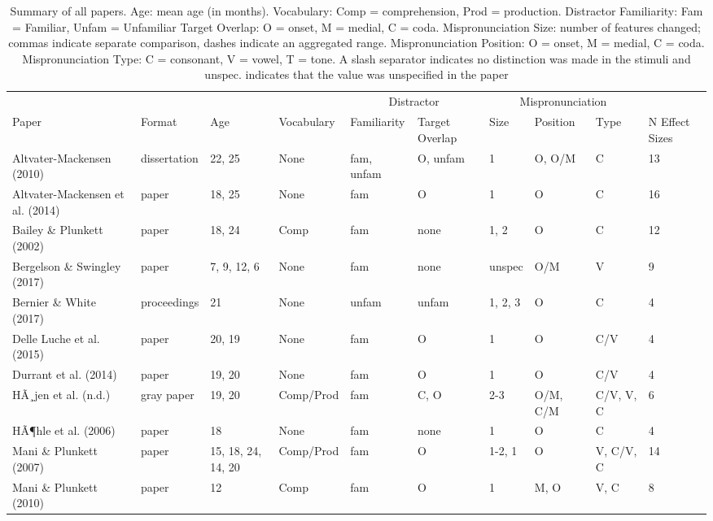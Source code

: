 \documentclass[
  man, noextraspace]{apa6}
\makeatletter
\newenvironment{lltable}{\begin{landscape}\begin{center}\begin{ThreePartTable}}{\end{ThreePartTable}\end{center}\end{landscape}}
\newcommand\LastLTentrywidth{1em}
\newlength\longtablewidth
\newcommand{\getlongtablewidth}{\begingroup \ifcsname LT@\roman{LT@tables}\endcsname \global\longtablewidth=0pt \renewcommand{\LT@entry}[2]{\global\advance\longtablewidth by ##2\relax\gdef\LastLTentrywidth{##2}}\@nameuse{LT@\roman{LT@tables}} \fi \endgroup}
\makeatother
\begin{document}
\begin{lltable}


\scriptsize{
\begin{longtable}{llllllllll}\noalign{\getlongtablewidth\global\LTcapwidth=\longtablewidth}
\caption{\label{tab:SummaryTable}Summary of all papers. Age: mean age (in months). Vocabulary: Comp = comprehension, Prod = production. Distractor Familiarity: Fam = Familiar, Unfam = Unfamiliar  Target Overlap: O = onset, M = medial, C = coda. Mispronunciation Size: number of features changed; commas indicate separate comparison, dashes indicate an aggregated range. Mispronunciation Position: O = onset, M = medial, C = coda. Mispronunciation Type: C = consonant, V = vowel, T = tone. A slash separator indicates no distinction was made in the stimuli and unspec. indicates that the value was unspecified in the paper}\\
\toprule
 &  &  &  & \multicolumn{2}{c}{Distractor} & \multicolumn{3}{c}{Mispronunciation}  &\\
\cmidrule(r){5-6} \cmidrule(r){7-9}
Paper & Format & Age & Vocabulary & Familiarity & Target Overlap & Size & Position & Type & N Effect Sizes\\
\midrule
Altvater-Mackensen (2010) & dissertation & 22, 25 & None & fam, unfam & O, unfam & 1 & O, O/M & C & 13\\
Altvater-Mackensen et al. (2014) & paper & 18, 25 & None & fam & O & 1 & O & C & 16\\
Bailey \& Plunkett (2002) & paper & 18, 24 & Comp & fam & none & 1, 2 & O & C & 12\\
Bergelson \& Swingley (2017) & paper & 7, 9, 12, 6 & None & fam & none & unspec & O/M & V & 9\\
Bernier \& White (2017) & proceedings & 21 & None & unfam & unfam & 1, 2, 3 & O & C & 4\\
Delle Luche et al. (2015) & paper & 20, 19 & None & fam & O & 1 & O & C/V & 4\\
Durrant et al. (2014) & paper & 19, 20 & None & fam & O & 1 & O & C/V & 4\\
HÃ¸jen et al. (n.d.) & gray paper & 19, 20 & Comp/Prod & fam & C, O & 2-3 & O/M, C/M & C/V, V, C & 6\\
HÃ¶hle et al. (2006) & paper & 18 & None & fam & none & 1 & O & C & 4\\
Mani \& Plunkett (2007) & paper & 15, 18, 24, 14, 20 & Comp/Prod & fam & O & 1-2, 1 & O & V, C/V, C & 14\\
Mani \& Plunkett (2010) & paper & 12 & Comp & fam & O & 1 & M, O & V, C & 8\\

\end{longtable}}
\end{lltable}
\end{document}
